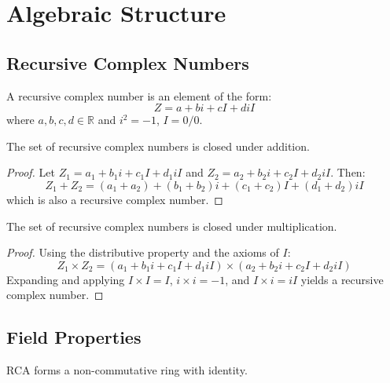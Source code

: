 \documentclass[12pt,a4paper]{article}
\begin{document}
\section{Algebraic Structure}

\subsection{Recursive Complex Numbers}

\begin{definition}
A recursive complex number is an element of the form:
\begin{equation}
Z = a + bi + cI + diI
\end{equation}
where $a, b, c, d \in \mathbb{R}$ and $i^2 = -1$, $I = 0/0$.
\end{definition}

\begin{theorem}
The set of recursive complex numbers is closed under addition.
\end{theorem}

\begin{proof}
Let $Z_1 = a_1 + b_1i + c_1I + d_1iI$ and $Z_2 = a_2 + b_2i + c_2I + d_2iI$. Then:
\begin{equation}
Z_1 + Z_2 = (a_1 + a_2) + (b_1 + b_2)i + (c_1 + c_2)I + (d_1 + d_2)iI
\end{equation}
which is also a recursive complex number.
\end{proof}

\begin{theorem}
The set of recursive complex numbers is closed under multiplication.
\end{theorem}

\begin{proof}
Using the distributive property and the axioms of $I$:
\begin{equation}
Z_1 \times Z_2 = (a_1 + b_1i + c_1I + d_1iI) \times (a_2 + b_2i + c_2I + d_2iI)
\end{equation}
Expanding and applying $I \times I = I$, $i \times i = -1$, and $I \times i = iI$ yields a recursive complex number.
\end{proof}

\subsection{Field Properties}

\begin{theorem}
RCA forms a non-commutative ring with identity.
\end{theorem}
\end{document}
